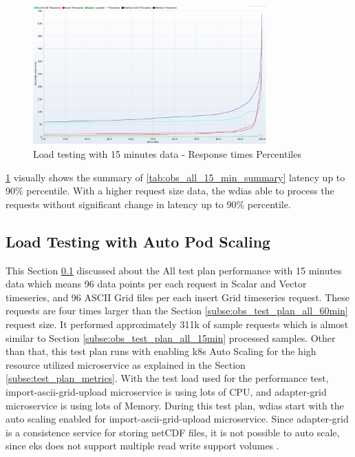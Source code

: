 \begin{figure}[htp]
    \centering
    \includegraphics[width=0.8\textwidth]{results/obs/all/obs_all_15m_response_times_percentiles.png}
    \caption{Load testing with 15 minutes data - Response times Percentiles}
    \label{fi:test_obs_all_15m_latency_percentile}
\end{figure}
\ref{fi:test_obs_all_15m_latency_percentile} visually shows the summary of \ref{tab:obs_all_15_min_summary} latency up to 90\% percentile. With a higher request size data, the \acrshort{wdias} able to process the requests without significant change in latency up to 90\% percentile.


\subsection{Load Testing with Auto Pod Scaling}
\label{subse:obs_test_plan_all_auto_15min}
This Section \ref{subse:obs_test_plan_all_auto_15min} discussed about the All test plan performance with 15 minutes data which means 96 data points per each request in Scalar and Vector timeseries, and 96 ASCII Grid files per each insert Grid timeseries request. These requests are four times larger than the Section \ref{subse:obs_test_plan_all_60min} request size. It performed approximately 311k of sample requests which is almost similar to Section \ref{subse:obs_test_plan_all_15min} processed samples.
Other than that, this test plan runs with enabling \acrshort{k8s} Auto Scaling for the high resource utilized microservice as explained in the Section \ref{subse:test_plan_metrics}. With the test load used for the performance test, import-ascii-grid-upload microservice is using lots of CPU, and adapter-grid microservice is using lots of Memory. During this test plan, \acrshort{wdias} start with the auto scaling enabled for import-ascii-grid-upload microservice. Since adapter-grid is a consistence service for storing netCDF files, it is not possible to auto scale, since \acrshort{eks} does not support multiple read write support volumes \cite{LinuxFoundationPersistentKubernetes}.

